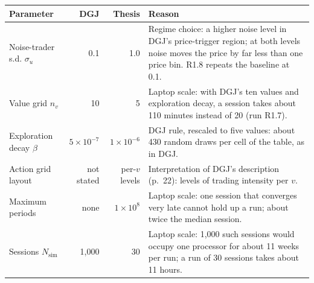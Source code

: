 \begin{tabular}{lrr>{\raggedright\arraybackslash}p{8.1cm}}
\toprule
Parameter & DGJ & Thesis & Reason \\
\midrule
Noise-trader s.d. $\sigma_u$ & 0.1 & 1.0 & Regime choice: a higher noise level in DGJ's price-trigger region; at both levels noise moves the price by far less than one price bin. R1.8 repeats the baseline at 0.1. \\
Value grid $n_v$ & 10 & 5 & Laptop scale: with DGJ's ten values and exploration decay, a session takes about 110 minutes instead of 20 (run R1.7). \\
Exploration decay $\beta$ & $5\times10^{-7}$ & $1\times10^{-6}$ & DGJ rule, rescaled to five values: about 430 random draws per cell of the table, as in DGJ. \\
Action grid layout & not stated & per-$v$ levels & Interpretation of DGJ's description (p.~22): levels of trading intensity per $v$. \\
Maximum periods & none & $1\times10^{8}$ & Laptop scale: one session that converges very late cannot hold up a run; about twice the median session. \\
Sessions $N_{\mathrm{sim}}$ & 1,000 & 30 & Laptop scale: 1,000 such sessions would occupy one processor for about 11 weeks per run; a run of 30 sessions takes about 11 hours. \\
\bottomrule
\end{tabular}
